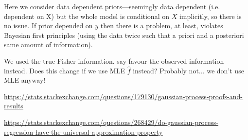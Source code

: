 Here we consider data dependent priors---seemingly data dependent (i.e. dependent on X) but the whole model is conditional on $X$ implicitly, so there is no issue.
If prior depended on $y$ then there is a problem, at least, violates Bayesian first principles (using the data twice such that a priori and a posteriori same amount of information).

We used the true Fisher information. \citet{efron1978assessing} say favour the observed information instead. Does this change if we use MLE $\hat f$ instead? Probably not... we don't use MLE anyway!

\url{https://stats.stackexchange.com/questions/179130/gaussian-process-proofs-and-results}

\url{https://stats.stackexchange.com/questions/268429/do-gaussian-process-regression-have-the-universal-approximation-property}
